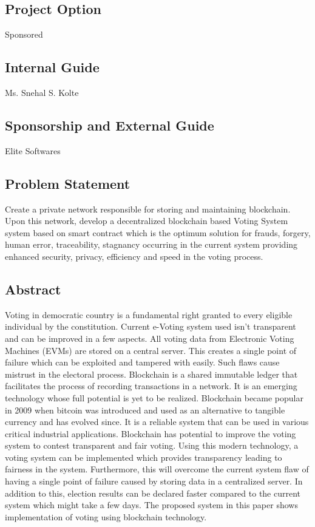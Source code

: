 \documentclass[oneside, 12pt]{book}
\begin{document}
\subsection{Project Option}
Sponsored
\subsection{Internal Guide}
Ms. Snehal S. Kolte
\subsection{Sponsorship and External Guide}
Elite Softwares
\subsection{Problem Statement}
Create a private network responsible for storing and maintaining blockchain. Upon this network, develop a decentralized blockchain based Voting System system based on smart contract which is the optimum solution for frauds, forgery, human error, traceability, stagnancy occurring in the current system providing enhanced security, privacy, efficiency and speed in the voting process.
\subsection{Abstract}
Voting in democratic country is a fundamental right granted to every eligible individual by the constitution. Current e-Voting system used isn’t transparent and can be improved in a few aspects. All voting data from Electronic Voting Machines (EVMs) are stored on a central server. This creates a single point of failure which can be exploited and tampered with easily. Such flaws cause mistrust in the electoral process. Blockchain is a shared  immutable ledger that facilitates the process of recording transactions in a network. It is an emerging technology whose full potential is yet to be realized. Blockchain became popular in 2009 when bitcoin was introduced and used as an alternative to tangible currency and has evolved since. It is a reliable system that can be used in various critical industrial applications. Blockchain has potential to improve the voting system to contest transparent and fair voting. Using this modern technology, a voting system can be implemented which provides transparency leading to fairness in the system. Furthermore, this will overcome the current system flaw of having a single point of failure caused by storing data in a centralized server. In addition to this, election results can be declared faster compared to the current system which might take a few days. The proposed system in this paper shows implementation of voting using blockchain technology.
\end{document}
